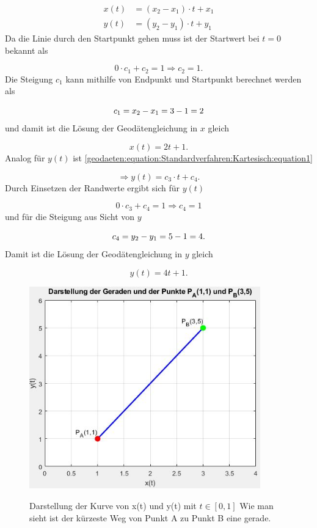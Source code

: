 \begin{align}
	x(t) &= (x_2 - x_1) \cdot t + x_1 \\
	y(t) &= (y_2 - y_1) \cdot t + y_1
\end{align}
Da die Linie durch den Startpunkt gehen muss ist der Startwert bei $t=0$ bekannt als
 
\begin{equation}
	0 \cdot c_1 + c_2 = 1 \Rightarrow c_2 = 1 .	
\end{equation}
Die Steigung $c_1$ kann mithilfe von Endpunkt und Startpunkt berechnet werden als

\begin{equation}
	c_1 = x_2 - x_1 \\ = 3-1 \\ = 2
\end{equation}
und damit ist die Lösung der Geodätengleichung in $x$ gleich

\begin{equation}
	x(t) = 2t + 1 .
\end{equation}
Analog für $y(t)$ ist \eqref{geodaeten:equation:Standardverfahren:Kartesisch:equation1}
  
\begin{equation}
	\Rightarrow y(t) = c_3 \cdot t + c_4  .
\end{equation}
Durch Einsetzen der Randwerte ergibt sich für $y(t)$ 

\begin{equation}
	0 \cdot c_3 + c_4 = 1 \Rightarrow c_4 = 1 
\end{equation}
und für die Steigung aus Sicht von $y$

\begin{equation}
	c_4 = y_2 - y_1 \\=5-1 = 4 .
\end{equation}
Damit ist die Lösung der Geodätengleichung in $y$ gleich

\begin{equation}
	y(t) = 4t + 1 .
\end{equation}

\begin{figure}
	\centering
	\includegraphics[width=10cm]{papers/geodaeten/Abbildungen/Standardverfahren/Kartesisch}
	\label{geodaeten:figure:Standardverfahren:Kartesisch:figure1}
	\caption{Darstellung der Kurve von x(t) und y(t) mit $t \in [0 , 1]$ Wie man sieht ist der kürzeste Weg von Punkt A zu Punkt B eine gerade.}
\end{figure}
